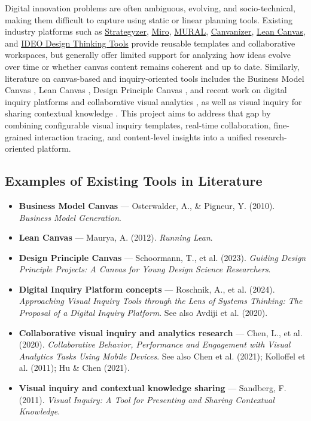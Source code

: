 \documentclass[11pt,a4paper]{article}
\begin{document}
Digital innovation problems are often ambiguous, evolving, and socio-technical, making them difficult to capture using static or linear planning tools. Existing industry platforms such as \href{https://www.strategyzer.com}{Strategyzer}, \href{https://miro.com}{Miro}, \href{https://www.mural.co}{MURAL}, \href{https://canvanizer.com}{Canvanizer}, \href{https://leanspark.ai/leancanvas}{Lean Canvas}, and \href{https://designthinking.ideo.com/}{IDEO Design Thinking Tools} provide reusable templates and collaborative workspaces, but generally offer limited support for analyzing how ideas evolve over time or whether canvas content remains coherent and up to date. Similarly, literature on canvas-based and inquiry-oriented tools includes the Business Model Canvas \citep{osterwalder2010business}, Lean Canvas \citep{maurya2012running}, Design Principle Canvas \citep{schoormann2023guiding}, and recent work on digital inquiry platforms \citep{roschnik2024approaching,avdiji2020design} and collaborative visual analytics \citep{chen2020collaborative,chen2021large,kolloffel2011comparing,hu2021systematic}, as well as visual inquiry for sharing contextual knowledge \citep{sandberg2011visual}. This project aims to address that gap by combining configurable visual inquiry templates, real-time collaboration, fine-grained interaction tracing, and content-level insights into a unified research-oriented platform.

\subsection{Examples of Existing Tools in Literature}

\begin{itemize}
  \item \textbf{Business Model Canvas} --- Osterwalder, A., \& Pigneur, Y. (2010). \emph{Business Model Generation}.
  \item \textbf{Lean Canvas} --- Maurya, A. (2012). \emph{Running Lean}.
  \item \textbf{Design Principle Canvas} --- Schoormann, T., et al. (2023). \emph{Guiding Design Principle Projects: A Canvas for Young Design Science Researchers}.
  \item \textbf{Digital Inquiry Platform concepts} --- Roschnik, A., et al. (2024). \emph{Approaching Visual Inquiry Tools through the Lens of Systems Thinking: The Proposal of a Digital Inquiry Platform}. See also Avdiji et al. (2020).
  \item \textbf{Collaborative visual inquiry and analytics research} --- Chen, L., et al. (2020). \emph{Collaborative Behavior, Performance and Engagement with Visual Analytics Tasks Using Mobile Devices}. See also Chen et al. (2021); Kolloffel et al. (2011); Hu \& Chen (2021).
  \item \textbf{Visual inquiry and contextual knowledge sharing} --- Sandberg, F. (2011). \emph{Visual Inquiry: A Tool for Presenting and Sharing Contextual Knowledge}.
\end{itemize}
\end{document}
